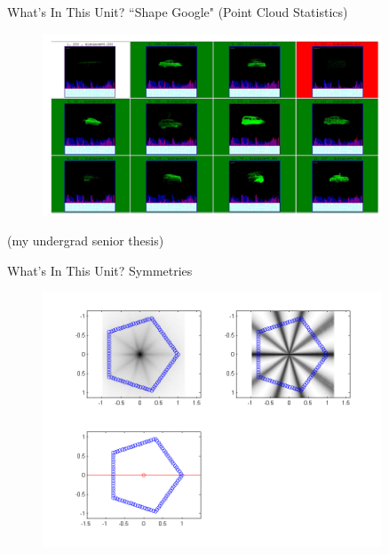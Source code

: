 \documentclass{beamer}
\begin{document}
\begin{frame}{What's In This Unit?}
``Shape Google" (Point Cloud Statistics)

\begin{figure}[t]
    \centering
	\includegraphics[width=0.9\textwidth]{ShapeGoogle.png}
\end{figure}

(my undergrad senior thesis)

\end{frame}

\begin{frame}{What's In This Unit?}
Symmetries

\begin{figure}[t]
    \centering
	\includegraphics[width=0.9\textwidth]{pentagonsym.png}
\end{figure}

\end{frame}
\end{document}
